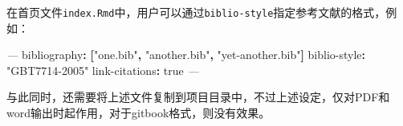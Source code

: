 \documentclass[]{ctexbook}
\newenvironment{Shaded}{\begin{snugshade}}{\end{snugshade}}
\newcommand{\AttributeTok}[1]{\textcolor[rgb]{0.77,0.63,0.00}{#1}}
\newcommand{\CharTok}[1]{\textcolor[rgb]{0.31,0.60,0.02}{#1}}
\newcommand{\FunctionTok}[1]{\textcolor[rgb]{0.00,0.00,0.00}{#1}}
\newcommand{\KeywordTok}[1]{\textcolor[rgb]{0.13,0.29,0.53}{\textbf{#1}}}
\newcommand{\PreprocessorTok}[1]{\textcolor[rgb]{0.56,0.35,0.01}{\textit{#1}}}
\newcommand{\StringTok}[1]{\textcolor[rgb]{0.31,0.60,0.02}{#1}}
\begin{document}
在首页文件\texttt{index.Rmd}中，用户可以通过\texttt{biblio-style}指定参考文献的格式，例如：

\begin{Shaded}
\begin{Highlighting}[]
\PreprocessorTok{---}
\FunctionTok{bibliography}\KeywordTok{:}\AttributeTok{ }\KeywordTok{[}\StringTok{"one.bib"}\KeywordTok{,}\AttributeTok{ }\StringTok{"another.bib"}\KeywordTok{,}\AttributeTok{ }\StringTok{"yet-another.bib"}\KeywordTok{]}
\FunctionTok{biblio-style}\KeywordTok{:}\AttributeTok{ }\StringTok{"GBT7714-2005"}
\FunctionTok{link-citations}\KeywordTok{:}\AttributeTok{ }\CharTok{true}
\PreprocessorTok{---}
\end{Highlighting}
\end{Shaded}

与此同时，还需要将上述文件复制到项目目录中，不过上述设定，仅对PDF和word输出时起作用，对于gitbook格式，则没有效果。



\backmatter
\printindex
\end{document}
